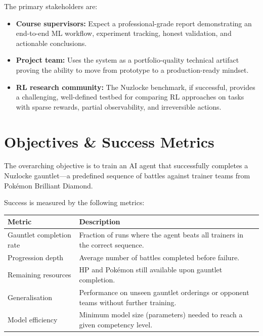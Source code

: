 The primary stakeholders are:

\begin{itemize}
  \item \textbf{Course supervisors:} Expect a professional-grade report
        demonstrating an end-to-end ML workflow, experiment tracking, honest
        validation, and actionable conclusions.
  \item \textbf{Project team:} Uses the system as a portfolio-quality technical
        artifact proving the ability to move from prototype to a
        production-ready mindset.
  \item \textbf{RL research community:} The Nuzlocke benchmark, if
        successful, provides a challenging, well-defined testbed for
        comparing RL approaches on tasks with sparse rewards, partial
        observability, and irreversible actions.
\end{itemize}

\section{Objectives \& Success Metrics}

The overarching objective is to train an AI agent that successfully completes a
Nuzlocke gauntlet---a predefined sequence of battles against trainer teams from
Pok\'{e}mon Brilliant Diamond.

Success is measured by the following metrics:

\begin{center}
\small
\begin{tabularx}{\textwidth}{l X}
  \toprule
  \textbf{Metric} & \textbf{Description} \\
  \midrule
  Gauntlet completion rate  & Fraction of runs where the agent beats all
                             trainers in the correct sequence. \\
  Progression depth         & Average number of battles completed before
                             failure. \\
  Remaining resources       & HP and Pok\'{e}mon still available upon
                             gauntlet completion. \\
  Generalisation            & Performance on unseen gauntlet orderings or
                             opponent teams without further training. \\
  Model efficiency          & Minimum model size (parameters) needed to reach
                             a given competency level. \\
  \bottomrule
\end{tabularx}
\end{center}

